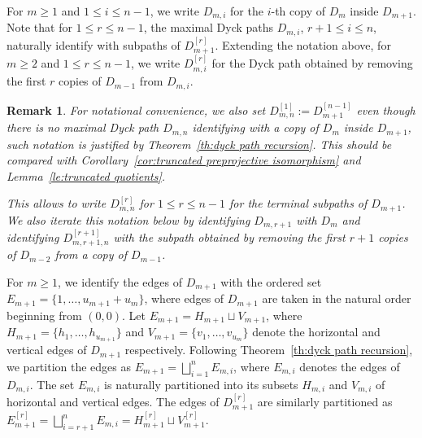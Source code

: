\documentclass{amsart}
\newtheorem{remark}[theorem]{Remark}
\numberwithin{equation}{section}
\begin{document}
For $m\ge1$ and $1\le i\le n-1$, we write $D_{m,i}$ for the $i$-th copy of $D_m$ inside $D_{m+1}$.
Note that for $1\le r\le n-1$, the maximal Dyck paths $D_{m,i}$, $r+1\le i\le n$, naturally identify with subpaths of $D_{m+1}^{[r]}$.
Extending the notation above, for $m\ge2$ and $1\le r\le n-1$, we write $D_{m,i}^{[r]}$ for the Dyck path obtained by removing the first $r$ copies of $D_{m-1}$ from $D_{m,i}$.
\begin{remark}
  For notational convenience, we also set $D_{m,n}^{[1]}:=D_{m+1}^{[n-1]}$ even though there is no maximal Dyck path $D_{m,n}$ identifying with a copy of $D_m$ inside $D_{m+1}$, such notation is justified by Theorem~\ref{th:dyck path recursion}.
  This should be compared with Corollary~\ref{cor:truncated preprojective isomorphism} and Lemma~\ref{le:truncated quotients}.

  This allows to write $D_{m,n}^{[r]}$ for $1\le r\le n-1$ for the terminal subpaths of $D_{m+1}$.
  We also iterate this notation below by identifying $D_{m,r+1}$ with $D_m$ and identifying $D_{m,r+1,n}^{[r+1]}$ with the subpath obtained by removing the first $r+1$ copies of $D_{m-2}$ from a copy of $D_{m-1}$.
\end{remark}

For $m\ge1$, we identify the edges of $D_{m+1}$ with the ordered set $E_{m+1}=\{1,\ldots,u_{m+1}+u_m\}$, where edges of $D_{m+1}$ are taken in the natural order beginning from $(0,0)$.
Let $E_{m+1}=H_{m+1}\sqcup V_{m+1}$, where $H_{m+1}=\{h_1,\ldots,h_{u_{m+1}}\}$ and $V_{m+1}=\{v_1,\ldots,v_{u_m}\}$ denote the horizontal and vertical edges of $D_{m+1}$ respectively.
Following Theorem~\ref{th:dyck path recursion}, we partition the edges as $E_{m+1}=\bigsqcup_{i=1}^n E_{m,i}$, where $E_{m,i}$ denotes the edges of $D_{m,i}$.
The set $E_{m,i}$ is naturally partitioned into its subsets $H_{m,i}$ and $V_{m,i}$ of horizontal and vertical edges.
The edges of $D_{m+1}^{[r]}$ are similarly partitioned as $E_{m+1}^{[r]}=\bigsqcup_{i=r+1}^n E_{m,i}=H_{m+1}^{[r]}\sqcup V_{m+1}^{[r]}$.
\end{document}
